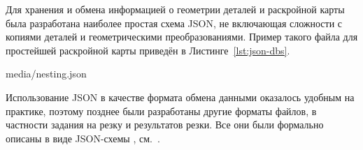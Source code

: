 Для хранения и обмена информацией о геометрии деталей
и раскройной карты
была разработана наиболее простая схема JSON,
не включающая сложности с копиями деталей и геометрическими
преобразованиями.
Пример такого файла для простейшей раскройной карты
приведён в Листинге~\ref{lst:json-dbs}.


    {media/nesting.json}

Использование JSON
в качестве формата обмена данными
оказалось удобным на практике,
поэтому позднее были разработаны другие
форматы файлов, в частности
задания на резку и результатов резки.
Все они были формально описаны в
виде JSON-схемы
\cite{bi:json-schema},
см.~\cite{bi:dbs-schema}.
